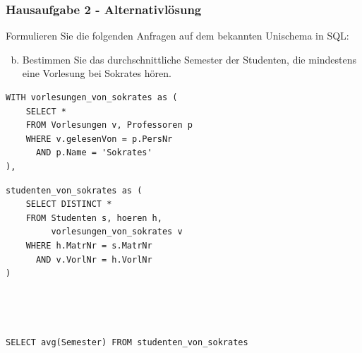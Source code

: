 \begin{frame}[fragile]
	\frametitle{Hausaufgabe 2 - Alternativlösung}
	\vspace{0.5cm}

	\begin{multicols}{2}
		Formulieren Sie die folgenden Anfragen auf dem bekannten Unischema in SQL:
		\begin{enumerate}[a)]
			\setcounter{enumi}{1}
			\item Bestimmen Sie das durchschnittliche Semester der Studenten, die mindestens eine Vorlesung bei Sokrates hören.
		\end{enumerate}
		\begin{verbatim}
WITH vorlesungen_von_sokrates as (
	SELECT * 
	FROM Vorlesungen v, Professoren p
	WHERE v.gelesenVon = p.PersNr
	  AND p.Name = 'Sokrates'
),
		\end{verbatim}
		\vfill\columnbreak

		\begin{verbatim}
studenten_von_sokrates as (
	SELECT DISTINCT *
	FROM Studenten s, hoeren h, 
		 vorlesungen_von_sokrates v
	WHERE h.MatrNr = s.MatrNr 
	  AND v.VorlNr = h.VorlNr
)




SELECT avg(Semester) FROM studenten_von_sokrates
		\end{verbatim}
	\end{multicols}
\end{frame}

